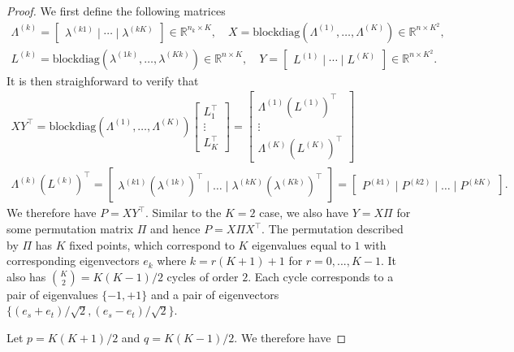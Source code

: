 \documentclass[12pt]{article}
\begin{document}
\begin{proof}
We first define the following matrices
\begin{gather}
\label{eq:xy}
\Lambda^{(k)} = \begin{bmatrix} \lambda^{(k1)} \mid \cdots \mid \lambda^{(kK)} \end{bmatrix}
\in \mathbb{R}^{n_k \times K}, \quad
X = \text{blockdiag}(\Lambda^{(1)}, \dots, \Lambda^{(K)}) \in
\mathbb{R}^{n \times K^2}, \\
L^{(k)} = \text{blockdiag}(\lambda^{(1k)}, \dots, \lambda^{(Kk)}) \in
\mathbb{R}^{n \times K}, \quad
Y = \begin{bmatrix} L^{(1)} \mid \cdots \mid L^{(K)} \end{bmatrix} \in
\mathbb{R}^{n \times K^2}.
\end{gather}
It is then straighforward to verify that
\begin{gather*}
  XY^{\top} = \text{blockdiag}(\Lambda^{(1)}, \dots,
\Lambda^{(K)}) \begin{bmatrix} L_1^{\top} \\ \vdots \\
  L_{K}^{\top} \end{bmatrix} = \begin{bmatrix} \Lambda^{(1)}
  (L^{(1)})^{\top} \\ \vdots \\
  \Lambda^{(K)} (L^{(K)})^{\top} \end{bmatrix} \\
\Lambda^{(k)} (L^{(k)})^{\top} = \begin{bmatrix} \lambda^{(k1)}
  (\lambda^{(1k)})^{\top} \mid \dots \mid \lambda^{(kK)}
  (\lambda^{(Kk)})^{\top} \end{bmatrix} = \begin{bmatrix} P^{(k1)}
  \mid P^{(k2)} \mid \dots \mid P^{(kK)} \end{bmatrix}.
\end{gather*}
We therefore have $P = X Y^\top$. 
Similar to the $K = 2$ case, we also have $Y = X \Pi$ for some permutation matrix
$\Pi$ and hence $P = X \Pi X^\top$.
The permutation described by $\Pi$ has $K$ fixed points, which correspond to
$K$ eigenvalues equal to $1$ with corresponding eigenvectors $e_k$ where
$k = r (K + 1) + 1$ for $r = 0, ..., K - 1$. It also has
$\binom{K}{2} = K (K - 1) / 2$ cycles of order $2$. Each cycle corresponds to
a pair of eigenvalues $\{-1,+1\}$ and a pair of eigenvectors
$\{(e_s + e_t)/\sqrt{2},(e_s - e_t)/ \sqrt{2}\}$.

Let $p = K (K + 1) / 2$ and $q = K (K - 1) / 2$. 
We therefore have


\end{proof}
\end{document}
